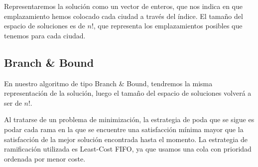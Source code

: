 \documentclass[a4paper, 11pt]{article} %
\begin{document}
	Representaremos la solución como un vector de enteros, que nos indica en que emplazamiento hemos colocado cada ciudad a 
	través del índice. El tamaño del espacio de soluciones es de $n!$, que representa los emplazamientos posibles que tenemos 
	para cada ciudad. 
      
      \subsection{Branch \& Bound}
      
    En nuestro algoritmo de tipo Branch \& Bound, tendremos la misma representación de la solución, luego el tamaño del espacio de soluciones volverá a ser de $n!$. 
    
    
    
    Al tratarse de un problema de minimización, la estrategia de poda que se sigue es podar cada rama en la que se encuentre una satisfacción mínima mayor que la satisfacción de la mejor solución encontrada hasta el momento. La estrategia de ramificación utilizada es Least-Cost FIFO, ya que usamos una cola con prioridad ordenada por menor coste.
    
\end{document}

